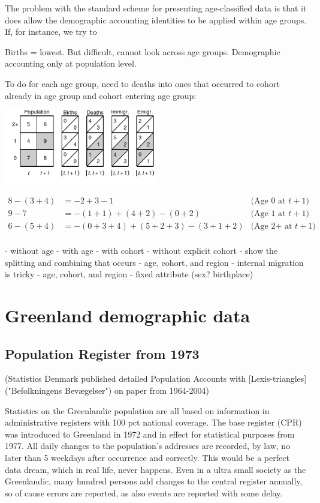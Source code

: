 \documentclass[USenglish]{article}
\begin{document}
The problem with the standard scheme for presenting age-classified data is that it does allow the demographic accounting identities to be applied within age groups. If, for instance, we try to  

Births = lowest. But difficult, cannot look across age groups. Demographic accounting only at population level.

To do for each age group, need to deaths into ones that occurred to cohort already in age group and cohort entering age group:
\begin{center}
\includegraphics[width=0.5\textwidth]{figures_accounts/fig_account_withage_lex.pdf}
\end{center}

\begin{align}
    8 - (3 + 4) & = -2 + 3 - 1 & \text{(Age 0 at $t+1$)} \\   
    9 - 7 & = -(1 + 1) + (4 + 2) - (0 + 2) & \text{(Age 1 at $t+1$)} \\
    6 - (5 + 4) & = -(0 + 3 + 4) + (5 + 2 + 3) - (3 + 1 + 2)  & \text{(Age 2+ at $t+1$)} \\
\end{align}


- without age
- with age
   - with cohort
   - without explicit cohort
- show the splitting and combining that occurs   
- age, cohort, and region
   - internal migration is tricky
- age, cohort, and region - fixed attribute (sex? birthplace)



\section{Greenland demographic data}

\subsection{Population Register from 1973} 

(Statistics Denmark published detailed Population Accounts with [Lexis-triangles]("Befolkningens Bevægelser") on paper from 1964-2004)

Statistics on the Greenlandic population are all based on information in administrative registers with 100 pct national coverage. The base register (CPR) was introduced to Greenland in 1972 and in effect for statistical purposes from 1977. All daily changes to the population’s addresses are recorded, by law, no later than 5 weekdays after occurrence and correctly. This would be a perfect data dream, which in real life, never happens. Even in a ultra small society as the Greenlandic, many hundred persons add changes to the central register annually, so of cause errors are reported, as also events are reported with some delay.
\end{document}
